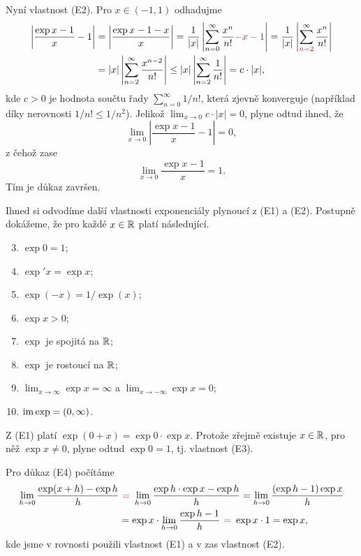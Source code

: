 \begin{thmproof}
 Nyní vlastnost (E2). Pro $x \in (-1,1)$ odhadujme
 \begin{align*}
  \left| \frac{\exp x - 1}{x} - 1 \right| &= \left| \frac{\exp x - 1 - x}{x}
  \right| = \frac{1}{|x|} \left| \sum_{n=0}^{\infty}\frac{x^{n}}{n!} \clr{- x -
  1} \right| = \frac{1}{|x|} \left| \sum_{\clr{n=2}}^{\infty} \frac{x^{n}}{n!}
  \right| \\
                                          &= |x| \left| \sum_{n=2}^{\infty}
                                          \frac{x^{n-2}}{n!} \right| \leq |x|
                                          \left| \sum_{n=2}^{\infty}
                                          \frac{1}{n!} \right| = c \cdot |x|,
 \end{align*}
 kde $c > 0$ je hodnota součtu řady $\sum_{n=0}^{\infty} 1 / n!$, která zjevně
 konverguje (například díky nerovnosti $1 / n! \leq 1 / n^2$). Jelikož $\lim_{x
 \to 0} c \cdot |x| = 0$, plyne odtud ihned, že
 \[
  \lim_{x \to 0} \left| \frac{\exp x - 1}{x} -1\right| = 0,
 \]
 z čehož zase
 \[
  \lim_{x \to 0} \frac{\exp x - 1}{x} = 1.
 \]
 Tím je důkaz završen.
\end{thmproof}

Ihned si odvodíme další vlastnosti exponenciály plynoucí z (E1) a (E2). Postupně
dokážeme, že pro každé $x \in \mathbb{R}$ platí následující.
\begin{enumerate}[label=(E\arabic*)]
 \setcounter{enumi}{2}
 \item $\exp 0 = 1$;
 \item $\exp' x = \exp x$;
 \item $\exp(-x) = 1 / \exp(x)$;
 \item $\exp x > 0$;
 \item $\exp$ je spojitá na $\mathbb{R}$;
 \item $\exp$ je rostoucí na $\mathbb{R}$;
 \item $\lim_{x \to \infty} \exp x = \infty$ a $\lim_{x \to -\infty} \exp x =
  0$;
 \item $\operatorname{im} \exp = (0,\infty)$.
\end{enumerate}

Z (E1) platí $\exp(0 + x) = \exp 0 \cdot \exp x$. Protože zřejmě existuje $x \in
\mathbb{R}$, pro něž $\exp x \neq 0$, plyne odtud $\exp 0 = 1$, tj. vlastnost (E3).

Pro důkaz (E4) počítáme
\begin{align*}
 \lim_{h \to 0} \frac{\exp (x + h) - \exp h}{h} &\clr{~=~} \lim_{h \to 0}
 \frac{\exp h \cdot \exp x - \exp h}{h} = \lim_{h \to 0} \frac{(\exp h - 1)\exp
 x}{h}\\
                                                &= \exp x \cdot \lim_{h \to 0}
                                                \frac{\exp h - 1}{h} \clb{~=~}
                                                \exp x \cdot 1 = \exp x,
\end{align*}
kde jsme v  rovnosti použili vlastnost (E1) a v  zas
vlastnost (E2).

